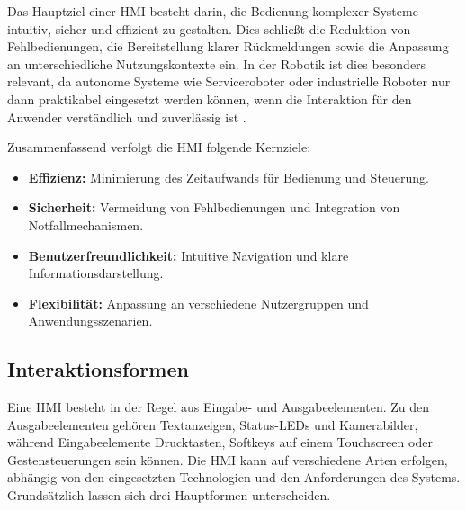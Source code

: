 Das Hauptziel einer HMI besteht darin, die Bedienung komplexer Systeme intuitiv, sicher und effizient zu gestalten. Dies schließt die Reduktion von Fehlbedienungen, die Bereitstellung klarer Rückmeldungen sowie die Anpassung an unterschiedliche Nutzungskontexte ein. In der Robotik ist dies besonders relevant, da autonome Systeme wie Serviceroboter oder industrielle Roboter nur dann praktikabel eingesetzt werden können, wenn die Interaktion für den Anwender verständlich und zuverlässig ist \autocite{Dix.2004}. 


Zusammenfassend verfolgt die HMI folgende Kernziele:

\begin{itemize}
	\item \textbf{Effizienz:} Minimierung des Zeitaufwands für Bedienung und Steuerung.
	\item \textbf{Sicherheit:} Vermeidung von Fehlbedienungen und Integration von Notfallmechanismen.
	\item \textbf{Benutzerfreundlichkeit:} Intuitive Navigation und klare Informationsdarstellung.
	\item \textbf{Flexibilität:} Anpassung an verschiedene Nutzergruppen und Anwendungsszenarien.
\end{itemize}

\subsection{Interaktionsformen}
\label{cha:Interaktionsformen}

Eine HMI besteht in der Regel aus Eingabe- und Ausgabeelementen. Zu den Ausgabeelementen gehören Textanzeigen, Status-LEDs und Kamerabilder, während Eingabeelemente Drucktasten, Softkeys auf einem Touchscreen oder Gestensteuerungen sein können. Die HMI kann auf verschiedene Arten erfolgen, abhängig von den eingesetzten Technologien und den Anforderungen des Systems. Grundsätzlich lassen sich drei Hauptformen unterscheiden.


